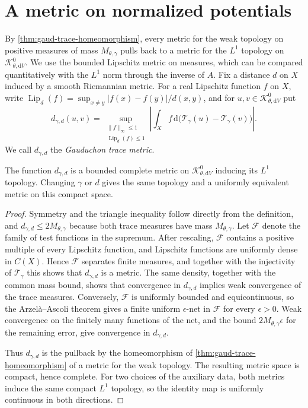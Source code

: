 \section{A metric on normalized potentials}
\label{sec:gauduchon-trace-metric}

By \cref{thm:gaud-trace-homeomorphism}, every metric for the weak topology on positive measures of mass $M_{\theta,\gamma}$ pulls back to a metric for the $L^1$ topology on $\mathcal K^0_{\theta,\mathrm{d}V}$. We use the bounded Lipschitz metric on measures, which can be compared quantitatively with the $L^1$ norm through the inverse of $A$. Fix a distance $d$ on $X$ induced by a smooth Riemannian metric. For a real Lipschitz function $f$ on $X$, write $\operatorname{Lip}_d(f)=\sup_{x\ne y}|f(x)-f(y)|/d(x,y)$, and for $u,v\in\mathcal K^0_{\theta,\mathrm{d}V}$ put
\[
 d_{\gamma,d}(u,v)
 =\sup_{\substack{\|f\|_\infty\leq1\\\operatorname{Lip}_d(f)\leq1}}
       \left|\int_X f\,\mathrm{d}\bigl(\mathcal T_\gamma(u)-\mathcal T_\gamma(v)\bigr)\right|.
\]
We call $d_{\gamma,d}$ the \emph{Gauduchon trace metric}.

\begin{corollary}\label{cor:gaud-trace-metric}
The function $d_{\gamma,d}$ is a bounded complete metric on $\mathcal K^0_{\theta,\mathrm{d}V}$ inducing its $L^1$ topology. Changing $\gamma$ or $d$ gives the same topology and a uniformly equivalent metric on this compact space.
\end{corollary}
\begin{proof}
Symmetry and the triangle inequality follow directly from the definition, and $d_{\gamma,d}\leq2M_{\theta,\gamma}$ because both trace measures have mass $M_{\theta,\gamma}$. Let $\mathcal F$ denote the family of test functions in the supremum. After rescaling, $\mathcal F$ contains a positive multiple of every Lipschitz function, and Lipschitz functions are uniformly dense in $C(X)$. Hence $\mathcal F$ separates finite measures, and together with the injectivity of $\mathcal T_\gamma$ this shows that $d_{\gamma,d}$ is a metric. The same density, together with the common mass bound, shows that convergence in $d_{\gamma,d}$ implies weak convergence of the trace measures. Conversely, $\mathcal F$ is uniformly bounded and equicontinuous, so the Arzel\`a--Ascoli theorem gives a finite uniform $\epsilon$-net in $\mathcal F$ for every $\epsilon>0$. Weak convergence on the finitely many functions of the net, and the bound $2M_{\theta,\gamma}\epsilon$ for the remaining error, give convergence in $d_{\gamma,d}$.

Thus $d_{\gamma,d}$ is the pullback by the homeomorphism of \cref{thm:gaud-trace-homeomorphism} of a metric for the weak topology. The resulting metric space is compact, hence complete. For two choices of the auxiliary data, both metrics induce the same compact $L^1$ topology, so the identity map is uniformly continuous in both directions.
\end{proof}

